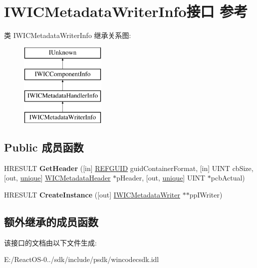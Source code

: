 \hypertarget{interface_i_w_i_c_metadata_writer_info}{}\section{I\+W\+I\+C\+Metadata\+Writer\+Info接口 参考}
\label{interface_i_w_i_c_metadata_writer_info}
类 I\+W\+I\+C\+Metadata\+Writer\+Info 继承关系图\+:\begin{figure}[H]
\begin{center}
\leavevmode
\includegraphics[height=4.000000cm]{interface_i_w_i_c_metadata_writer_info}
\end{center}
\end{figure}
\subsection*{Public 成员函数}
\begin{DoxyCompactItemize}
\item 
\mbox{\label{interface_i_w_i_c_metadata_writer_info_a85aea70c29ca041d54c1b85f1aea4d14}} 
H\+R\+E\+S\+U\+LT {\bfseries Get\+Header} (\mbox{[}in\mbox{]} \hyperlink{struct___g_u_i_d}{R\+E\+F\+G\+U\+ID} guid\+Container\+Format, \mbox{[}in\mbox{]} U\+I\+NT cb\+Size, \mbox{[}out, \hyperlink{interfaceunique}{unique}\mbox{]} \hyperlink{struct_w_i_c_metadata_header}{W\+I\+C\+Metadata\+Header} $\ast$p\+Header, \mbox{[}out, \hyperlink{interfaceunique}{unique}\mbox{]} U\+I\+NT $\ast$pcb\+Actual)
\item 
\mbox{\label{interface_i_w_i_c_metadata_writer_info_a3fca52edfae2173eef8cc593a0c51f84}} 
H\+R\+E\+S\+U\+LT {\bfseries Create\+Instance} (\mbox{[}out\mbox{]} \hyperlink{interface_i_w_i_c_metadata_writer}{I\+W\+I\+C\+Metadata\+Writer} $\ast$$\ast$pp\+I\+Writer)
\end{DoxyCompactItemize}
\subsection*{额外继承的成员函数}


该接口的文档由以下文件生成\+:\begin{DoxyCompactItemize}
\item 
E\+:/\+React\+O\+S-\/0../sdk/include/psdk/wincodecsdk.\+idl\end{DoxyCompactItemize}
